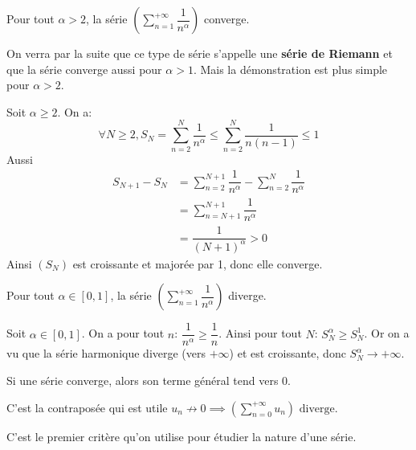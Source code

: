 \documentclass[a4paper, 12pt]{article}
\begin{document}
\begin{proposition}{}{}
    Pour tout $\alpha \gt 2$, la série $(\sum\limits_{n=1}^{+\infty}\dfrac{1}{n^\alpha})$ converge.
\end{proposition}

\begin{remarque}
    On verra par la suite que ce type de série s'appelle une \textbf{série de Riemann} et que la série converge aussi pour $\alpha \gt 1$.
    Mais la démonstration est plus simple pour $\alpha \gt 2$.
\end{remarque}

\begin{demonstration}
    Soit $\alpha \geq 2$.\n
    On a:
    $$
    \forall N \geq 2, S_N = \sum\limits_{n=2}^{N}\dfrac{1}{n^\alpha} \leq \sum\limits_{n=2}^{N}\dfrac{1}{n(n-1)} \leq 1
    $$
    Aussi
    \begin{align*}
    S_{N+1} - S_N &= \sum\limits_{n=2}^{N+1}\dfrac{1}{n^\alpha} - \sum\limits_{n=2}^{N}\dfrac{1}{n^\alpha}\\
    &= \sum\limits_{n=N+1}^{N+1}\dfrac{1}{n^\alpha}\\
    &= \dfrac{1}{(N+1)^\alpha} \gt 0
    \end{align*}
    Ainsi $(S_N)$ est croissante et majorée par 1, donc elle converge.
\end{demonstration}

\begin{proposition}{}{}
    Pour tout $\alpha \in [0, 1]$, la série $(\sum\limits_{n=1}^{+\infty}\dfrac{1}{n^\alpha})$ diverge.
\end{proposition}

\begin{demonstration}
    Soit $\alpha \in [0, 1]$.\n
    On a pour tout $n$: $\dfrac{1}{n^\alpha} \geq \dfrac{1}{n}$.\n
    Ainsi pour tout $N$: $S_N^\alpha \geq S_N^1$.\n
    Or on a vu que la série harmonique diverge (vers $+\infty$) et est croissante, donc $S_N^\alpha \rightarrow +\infty$.\n
\end{demonstration}

\begin{proposition}{}{}
    Si une série converge, alors son terme général tend vers 0.
\end{proposition}

\begin{methode}
    C'est la contraposée qui est utile\n
    $u_n \not\rightarrow 0 \implies \left(\sum\limits_{n=0}^{+\infty} u_n\right) \text{ diverge}$.

    C'est le premier critère qu'on utilise pour étudier la nature d'une série.
\end{methode}
\end{document}
